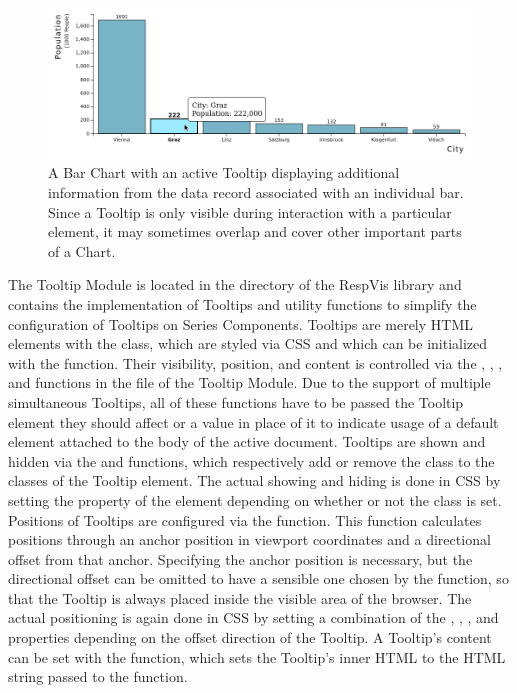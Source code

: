 \begin{figure}[tp]
\centering
\includegraphics[keepaspectratio,width=\linewidth,height=\fullh]
{images/tooltip.png}
\caption[Tooltip Example]{%
A Bar Chart with an active Tooltip displaying
additional information from the data record associated with an
individual bar. Since a Tooltip is only visible during
interaction with a particular element, it may sometimes overlap
and cover other important parts of a Chart.
}
\label{fig:Tooltip}
\end{figure}


The Tooltip Module is located in the  directory
of the RespVis library and contains the implementation of Tooltips and
utility functions to simplify the configuration of Tooltips on Series
Components. Tooltips are merely HTML  elements with the
 class, which are styled via CSS and which can be
initialized with the  function. Their visibility,
position, and content is controlled via the ,
, , and 
functions in the  file of the Tooltip Module. Due to
the support of multiple simultaneous Tooltips, all of these functions
have to be passed the Tooltip element they should affect or a
 value in place of it to indicate usage of a default
element attached to the body of the active document. Tooltips are
shown and hidden via the  and 
functions, which respectively add or remove the  class to
the classes of the Tooltip element. The actual showing and hiding is
done in CSS by setting the  property of the element
depending on whether or not the  class is set. Positions
of Tooltips are configured via the  function.
This function calculates positions through an anchor position in
viewport coordinates and a directional offset from that anchor.
Specifying the anchor position is necessary, but the directional
offset can be omitted to have a sensible one chosen by the
 function, so that the Tooltip is always placed
inside the visible area of the browser. The actual positioning is
again done in CSS by setting a combination of the ,
, , and  properties depending on
the offset direction of the Tooltip. A Tooltip's content can be set
with the  function, which sets the Tooltip's inner
HTML to the HTML string passed to the function.

